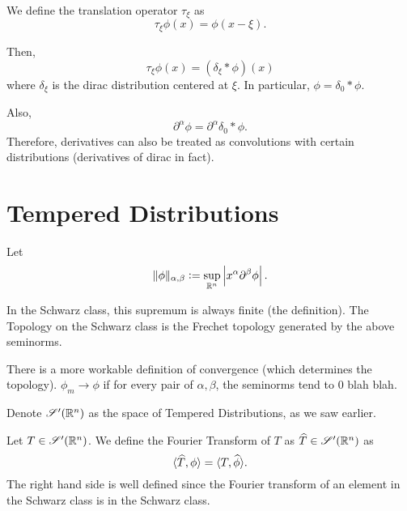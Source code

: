 \begin{example}
    We define the translation operator $\tau_\xi$ as 
    \begin{equation*}
        \tau_\xi\phi(x) = \phi(x - \xi).
    \end{equation*}

    Then, 
    \begin{equation*}
        \tau_\xi\phi(x) = (\delta_\xi\ast\phi)(x)
    \end{equation*}
    where $\delta_\xi$ is the dirac distribution centered at $\xi$. In particular, $\phi = \delta_0\ast\phi$.

    Also, 
    \begin{equation*}
        \partial^\alpha\phi = \partial^\alpha\delta_0\ast\phi.
    \end{equation*}
    Therefore, derivatives can also be treated as convolutions with certain distributions (derivatives of dirac in fact).
\end{example}

\section*{Tempered Distributions}

Let 
\begin{equation*}
    \|\phi\|_{\alpha,\beta} := \sup_{\mathbb{R}^n} \left|x^\alpha\partial^\beta\phi\right|.
\end{equation*}

In the Schwarz class, this supremum is always finite (the definition). The Topology on the Schwarz class is the Frechet topology generated by the above seminorms.

There is a more workable definition of convergence (which determines the topology). $\phi_m\to\phi$ if for every pair of $\alpha, \beta$, the seminorms tend to $0$ blah blah.

Denote $\mathscr S'(\mathbb{R}^n)$ as the space of Tempered Distributions, as we saw earlier.

\begin{definition}
    Let $T\in\mathscr S'(\mathbb{R}^n)$. We define the Fourier Transform of $T$ as $\widehat{T}\in\mathscr S'(\mathbb{R}^n)$ as 
    \begin{equation*}
        \langle\widehat{T},\phi\rangle = \langle T, \widehat{\phi}\rangle.
    \end{equation*}
    The right hand side is well defined since the Fourier transform of an element in the Schwarz class is in the Schwarz class.
\end{definition}

